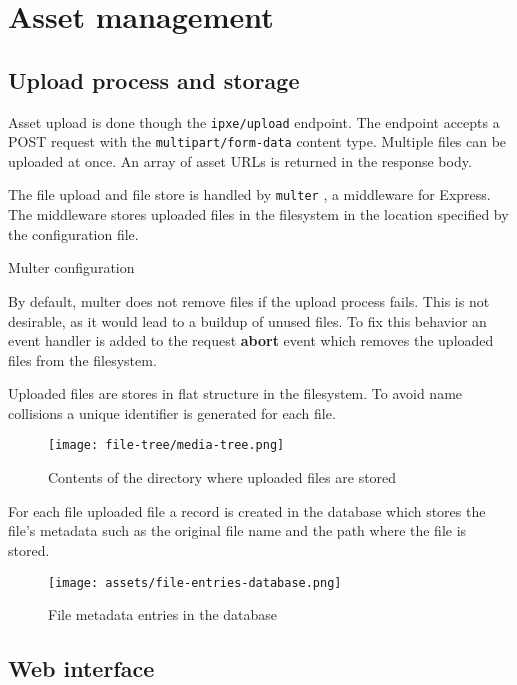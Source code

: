 \documentclass[../main.tex]{subfiles}
\begin{document}
\section{Asset management}

\subsection{Upload process and storage}

Asset upload is done though the \texttt{ipxe/upload} endpoint. The endpoint accepts a POST request with the \texttt{multipart/form-data} content type.
Multiple files can be uploaded at once. An array of asset URLs is returned in the response body.

The file upload and file store is handled by \texttt{multer} \cite{multer}, a middleware for Express.
The middleware stores uploaded files in the filesystem in the location specified by the configuration file.

\begin{listing}[H]
  \caption{Multer configuration}
\end{listing}

By default, multer does not remove files if the upload process fails. This is not desirable, as it would lead to a buildup of unused files.
To fix this behavior an event handler is added to the request \textbf{abort} event which removes the uploaded files from the filesystem.

Uploaded files are stores in flat structure in the filesystem. To avoid name collisions a unique identifier is generated for each file.

\begin{figure}[H]
  \centering
  \texttt{[image: file-tree/media-tree.png]}
  \caption{Contents of the directory where uploaded files are stored}
\end{figure}

For each file uploaded file a record is created in the database which stores the file's metadata such as the original file name and the path where the file is stored.

\begin{figure}[H]
  \centering
  \texttt{[image: assets/file-entries-database.png]}
  \caption{File metadata entries in the database}
\end{figure}

\subsection{Web interface}
\end{document}
